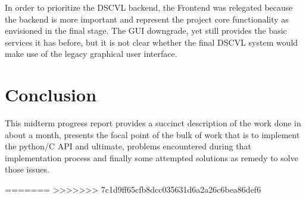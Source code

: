 \documentclass[onecolumn, draftclsnofoot,10pt, compsoc]{IEEEtran}
\begin{document}
\begin{singlespace}
In order to prioritize the DSCVL backend, the Frontend was relegated because the backend is more important and represent the project core functionality as envisioned in the final stage. The GUI downgrade, yet still provides the basic services it has before, but it is not clear whether the final DSCVL system would make use of the legacy graphical user interface.
		
		

	\section{Conclusion}	
	This midterm progress report provides a succinct description of the work done in about a month, presents the focal point of the bulk of work that is to implement the python/C API and ultimate, problems encountered during that implementation process and finally some attempted solutions as remedy to solve those issues. 
		
=======
	\clearpage
>>>>>>> 7c1d9ff65cfb8dcc035631d6a2a26c6bea86def6

\end{singlespace}
\end{document}
